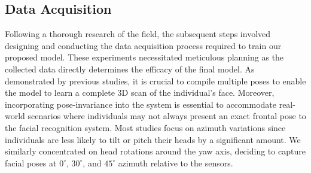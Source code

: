 \documentclass{mpaper}
\begin{document}
\subsection{Data Acquisition}
Following a thorough research of the field, the subsequent steps involved designing and conducting the data acquisition process required to train our proposed model. These experiments necessitated meticulous planning as the collected data directly determines the efficacy of the final model. As demonstrated by previous studies, it is crucial to compile multiple poses to enable the model to learn a complete 3D scan of the individual's face. Moreover, incorporating pose-invariance into the system is essential to accommodate real-world scenarios where individuals may not always present an exact frontal pose to the facial recognition system. Most studies focus on azimuth variations since individuals are less likely to tilt or pitch their heads by a significant amount. We similarly concentrated on head rotations around the yaw axis, deciding to capture facial poses at $0^\circ$, $30^\circ$, and $45^\circ$ azimuth relative to the sensors.
\end{document}

